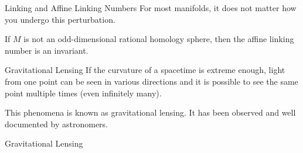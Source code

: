 \documentclass{beamer}
\begin{document}
    \begin{frame}{Linking and Affine Linking Numbers}
        For most manifolds, it does not matter how you undergo
        this perturbation.
        \begin{theorem}
            If $M$ is not an odd-dimensional rational homology sphere, then
            the affine linking number is an invariant.
        \end{theorem}
    \end{frame}
    \begin{frame}{Gravitational Lensing}
        If the curvature of a spacetime is extreme enough, light from one point
        can be seen in various directions and it is possible to see the same
        point multiple times (even infinitely many).
        \par\hfill\par
        This phenomena is known as gravitational lensing. It has been observed
        and well documented by astronomers.
    \end{frame}
    \begin{frame}{Gravitational Lensing}
        \begin{figure}
            \centering
        \end{figure}
    \end{frame}
\end{document}
